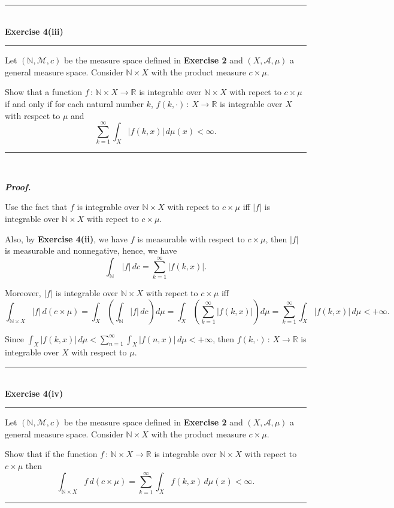 \documentclass[a4paper,11pt]{article}
\begin{document}

\begin{flushleft}
	\rule[-0.5ex]{17cm}{2pt}\\
		\textbf{Exercise 4(iii)}\\
	\rule[1.5ex]{17cm}{0.5pt}
		Let $(\mathbb{N},\mathcal{M},c)$ be the measure space defined in \textbf{Exercise 2} and $(X, \mathcal{A}, \mu)$ a general measure space. Consider $\mathbb{N} \times X$ with the product measure $c \times \mu$.

		Show that a function $f\,:\,\mathbb{N} \times X \to \mathbb{R}$ is integrable over $\mathbb{N} \times X$ with repect to $c \times \mu$ if and only if for each natural number $k$, $f(k,\cdot)\,:\,X \to \mathbb{R}$ is integrable over $X$ with respect to $\mu$ and
			$$\sum_{k=1}^\infty\int_X|f(k,x)|\,d\mu(x) < \infty.$$
	\rule[1.0ex]{17cm}{0.5pt}\
\end{flushleft}

\textbf{\textit{Proof.}}

Use the fact that $f$ is integrable over $\mathbb{N} \times X$ with repect to $c \times \mu$ iff $|f|$ is integrable over $\mathbb{N} \times X$ with repect to $c \times \mu$.

Also, by \textbf{Exercise 4(ii)}, we have $f$ is measurable with respect to $c \times \mu$, then $|f|$ is measurable and nonnegative, hence, we have
	$$\int_{\mathbb{N}}\,|f|\,dc
	= \sum_{k = 1}^\infty|f(k,x)|.$$

Moreover, $|f|$ is integrable over $\mathbb{N} \times X$ with repect to $c \times \mu$ iff
	$$\int_{\mathbb{N} \times X} |f|\,d(c \times \mu)
	= \int_X \left( \int_{\mathbb{N}} |f|\,dc\right)d\mu
	= \int_X \left( \sum_{k=1}^\infty |f(k,x)| \right) d\mu
	= \sum_{k=1}^\infty \int_X |f(k,x)|\,d\mu
	< +\infty.$$

Since $\int_X |f(k,x)|\,d\mu < \sum_{n=1}^\infty \int_X |f(n,x)|\,d\mu < +\infty$, then $f(k,\cdot)\,:\,X \to \mathbb{R}$ is integrable over $X$ with respect to $\mu$.\\




\begin{flushleft}
	\rule[-0.5ex]{17cm}{2pt}\\
		\textbf{Exercise 4(iv)}\\
	\rule[1.5ex]{17cm}{0.5pt}
		Let $(\mathbb{N},\mathcal{M},c)$ be the measure space defined in \textbf{Exercise 2} and $(X, \mathcal{A}, \mu)$ a general measure space. Consider $\mathbb{N} \times X$ with the product measure $c \times \mu$.

		Show that if the function $f\,:\,\mathbb{N} \times X \to \mathbb{R}$ is integrable over $\mathbb{N} \times X$ with repect to $c \times \mu$ then
			$$\int_{\mathbb{N} \times X} f\,d(c \times \mu)
			= \sum_{k=1}^\infty\int_X f(k,x)\,d\mu(x)
			< \infty.$$
	\rule[1.0ex]{17cm}{0.5pt}\
\end{flushleft}
\end{document}
